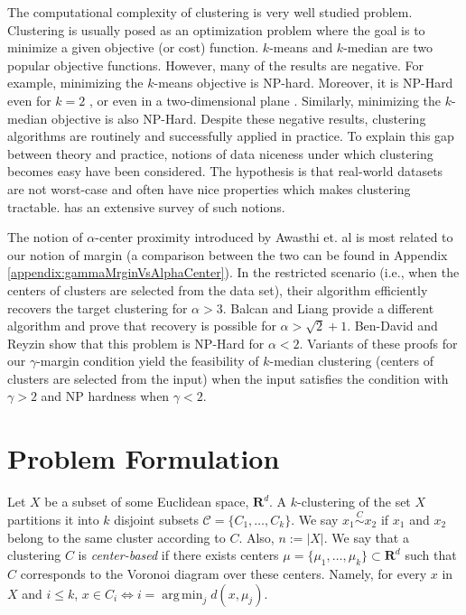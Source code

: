 \documentclass[12pt]{article}
\newcommand{\mc}{\mathcal}
\newcommand{\mb}{\mathbf}
\DeclareMathOperator*{\argmin}{arg\,min}
\begin{document}
The computational complexity of clustering is very well studied problem. Clustering is usually posed as an optimization problem where the goal is to minimize a given objective (or cost) function. $k$-means and $k$-median are two popular objective functions. However, many of the results are negative. For example, minimizing the $k$-means objective is NP-hard. Moreover, it is NP-Hard even for $k=2$ \cite{dasgupta2008hardness}, or even in a two-dimensional plane \cite{vattani2009hardness,mahajan2009planar}. Similarly, minimizing the $k$-median objective is also NP-Hard. Despite these negative results, clustering algorithms are routinely and successfully applied in practice. To explain this gap between theory and practice, notions of data niceness under which clustering becomes easy have been considered. The hypothesis is that real-world datasets are not worst-case and often have nice properties which makes clustering tractable. \cite{Ben-David15} has an extensive survey of such notions.

The notion of $\alpha$-center proximity introduced by Awasthi et. al \cite{awasthi2012center} is most related to our notion of margin (a comparison between the two can be found in Appendix \ref{appendix:gammaMrginVsAlphaCenter}). In the restricted scenario (i.e., when the centers of clusters are selected from the data set), their algorithm efficiently recovers the target clustering for $\alpha > 3$.  Balcan and Liang \cite{balcan2012clustering} provide a different algorithm and prove that recovery is possible for $\alpha > \sqrt{2} + 1$. Ben-David and Reyzin \cite{ben2014data} show that this problem is NP-Hard for $\alpha < 2$. Variants of these proofs for our $\gamma$-margin condition yield the feasibility of $k$-median clustering (centers of clusters are selected from the input) when the input satisfies the condition with $\gamma >2$ and NP hardness when $\gamma <2$.


\section{Problem Formulation}

Let $X$ be a subset of some Euclidean space, $\mb{R}^d$. A $k$-clustering of the set $X$ partitions it into $k$ disjoint subsets $\mc C = \{C_1, \ldots, C_k\}$. We say $x_1 \overset{C}{\sim} x_2$ if $x_1$ and $x_2$ belong to the same cluster according to $C$. Also, $n := |X|$. We say that a clustering $C$ is \emph{center-based} if there exists centers $\mu = \{\mu_1, \ldots, \mu_k\} \subset \mb R^d$ such that $C$ corresponds to the Voronoi diagram over these centers. Namely, for every $x$ in $X$ and $i \leq k$,  $x\in C_i \Leftrightarrow i=\argmin_j d(x,\mu_j)$. 
\end{document}
